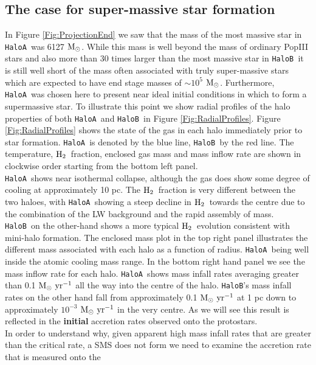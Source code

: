 \documentclass[twocolumn,iop,revtex4]{openjournal}
\newcommand{\msolarc} {$\rm{M_{\odot}}$}
\newcommand{\msolaryr} {$\rm{M_{\odot}~yr^{-1}}~$}
\newcommand{\molH} {$\rm{H_2}$~}
\newcommand{\ha} {\texttt{HaloA~}}
\newcommand{\hb} {\texttt{HaloB~}}
\newcommand{\hbc} {\texttt{HaloB}}
\begin{document}
\subsection{The case for super-massive star formation}
In Figure \ref{Fig:ProjectionEnd} we saw that the mass of the most massive star in \ha was
6127 \msolarc. While this mass is well beyond the mass of ordinary PopIII stars
\citep{Turk_2009, Greif_2011, Wise_2012b, Crosby_2013, Susa_2014, Hirano_2014, Stacy_2016} and also more than 30 times
larger than the most massive star in \hb it is still well short of the mass often associated with
truly super-massive stars \citep[e.g.][]{Woods_2018} which are expected to have
end stage masses of $\sim 10^5$ \msolarc. Furthermore, \ha was chosen here to present near ideal
initial conditions in which to form a supermassive star.
To illustrate this point we show radial profiles of the halo properties of both \ha and \hb in
Figure \ref{Fig:RadialProfiles}. Figure \ref{Fig:RadialProfiles} shows the state of the gas
in each halo immediately prior to star formation. \ha is denoted by the blue line, \hb by the red line.
The temperature, \molH fraction, enclosed gas mass and mass inflow rate are shown in
clockwise order starting from the bottom left panel. \\
\indent \ha shows near isothermal collapse, although the gas does
show some degree of cooling at approximately 10 pc. The \molH fraction is very different between
the two haloes, with \ha showing a steep decline in \molH towards the centre due to the combination
of the LW background and the rapid assembly of mass. \hb on the other-hand shows a more typical
\molH evolution consistent with mini-halo formation. The enclosed mass plot in the top right panel
illustrates the different mass associated with each halo as a function of radius. \ha being well
inside the atomic cooling mass range. In the bottom right hand panel we see the mass inflow rate for
each halo. \ha shows mass infall rates averaging greater than 0.1 \msolaryr all the way into the
centre of the halo. \hbc's mass infall rates on the other hand fall from approximately
0.1 \msolaryr at 1 pc down to approximately $10^{-3}$ \msolaryr in the very centre. As we will see
this result is reflected in the \textbf{initial} accretion rates observed onto the protostars. \\
\indent In order to understand why, given apparent high mass infall rates that are greater than the
critical rate, a SMS does not form we need to examine the accretion rate that is measured onto the
\end{document}
